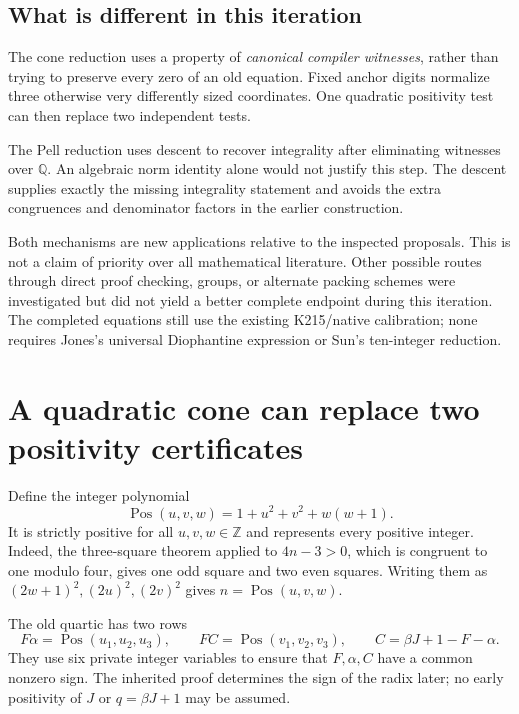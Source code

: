 \documentclass[11pt]{article}
\theoremstyle{remark}\newtheorem{remark}[theorem]{Remark}
\newcommand{\Z}{\mathbb Z}\newcommand{\Q}{\mathbb Q}\newcommand{\N}{\mathbb N}\newcommand{\Pos}{\operatorname{Pos}}\newcommand{\Cone}{\mathcal C}\newcommand{\Con}{\operatorname{Con}}
\begin{document}
\subsection{What is different in this iteration}

The cone reduction uses a property of \emph{canonical compiler witnesses}, rather than trying to preserve every zero of an old equation. Fixed anchor digits normalize three otherwise very differently sized coordinates. One quadratic positivity test can then replace two independent tests.

The Pell reduction uses descent to recover integrality after eliminating witnesses over $\Q$. An algebraic norm identity alone would not justify this step. The descent supplies exactly the missing integrality statement and avoids the extra congruences and denominator factors in the earlier construction.

Both mechanisms are new applications relative to the inspected proposals. This is not a claim of priority over all mathematical literature. Other possible routes through direct proof checking, groups, or alternate packing schemes were investigated but did not yield a better complete endpoint during this iteration. The completed equations still use the existing K215/native calibration; none requires Jones's universal Diophantine expression or Sun's ten-integer reduction.

\section{A quadratic cone can replace two positivity certificates}\label{sec:cone}

Define the integer polynomial
\[
 \Pos(u,v,w)=1+u^2+v^2+w(w+1).
\]
It is strictly positive for all $u,v,w\in\Z$ and represents every positive integer. Indeed, the three-square theorem applied to $4n-3>0$, which is congruent to one modulo four, gives one odd square and two even squares. Writing them as $(2w+1)^2,(2u)^2,(2v)^2$ gives $n=\Pos(u,v,w)$.

The old quartic has two rows
\begin{equation}\label{eq:oldguards}
 F\alpha=\Pos(u_1,u_2,u_3),\qquad
 FC=\Pos(v_1,v_2,v_3),\qquad
 C=\beta J+1-F-\alpha.
\end{equation}
They use six private integer variables to ensure that $F,\alpha,C$ have a common nonzero sign. The inherited proof determines the sign of the radix later; no early positivity of $J$ or $q=\beta J+1$ may be assumed.
\end{document}

